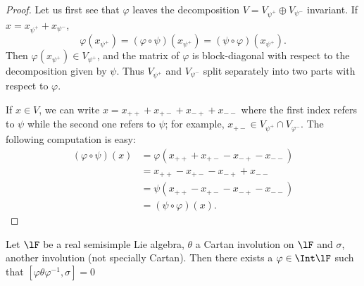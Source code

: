 \begin{proof}
Let us first see that $\varphi$ leaves the decomposition $V=V_{\psi^+}\oplus V_{\psi^-}$ invariant. If $x=x_{\psi^+}+x_{\psi^-}$,
\[
   \varphi(x_{\psi^+})=(\varphi\circ\psi)(x_{\psi^+})=(\psi\circ\varphi)(x_{\psi^+}).
\]
Then $\varphi(x_{\psi^+})\in V_{\psi^+}$, and the matrix of $\varphi$ is block-diagonal with respect to the decomposition given by $\psi$. Thus $V_{\psi^+}$ and $V_{\psi^-}$ split separately into two parts with respect to $\varphi$.

If $x\in V$, we can write $x=x_{++}+x_{+-}+x_{-+}+x_{--}$ where the first index refers to $\psi$ while the second one refers to $\psi$; for example, $x_{+-}\in V_{\psi^+}\cap V_{\varphi^-}$. The following computation is easy:
\begin{equation}
\begin{split}
(\varphi\circ\psi)(x)&=\varphi(x_{++}+x_{+-}-x_{-+}-x_{--})\\
                 &=x_{++}-x_{+-}-x_{-+}+x_{--}\\
         &=\psi(x_{++}-x_{+-}-x_{-+}-x_{--})\\
         &=(\psi\circ\varphi)(x).
\end{split}
\end{equation}
\end{proof}

\begin{theorem}
Let $\lF$ be a real semisimple Lie algebra, $\theta$ a Cartan involution on $\lF$ and $\sigma$, another involution (not specially Cartan). Then there exists a $\varphi\in\Int\lF$ such that $[\varphi\theta\varphi^{-1},\sigma]=0$ 
\label{tho:sigma_theta_un}
\end{theorem}

